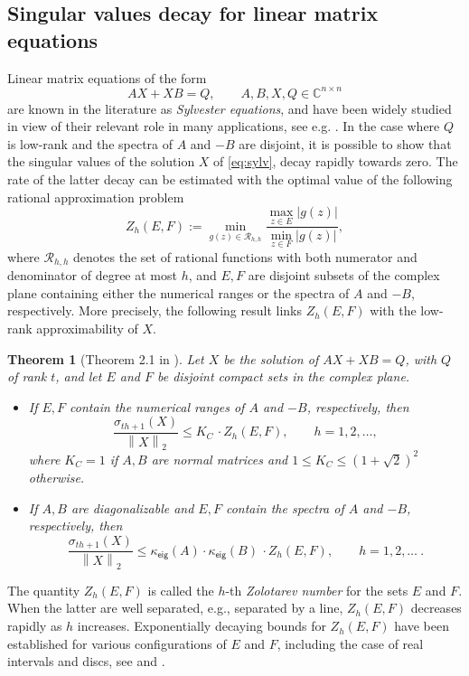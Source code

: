 \documentclass[a4paper,10pt]{article}
\newcommand{\norm}[1]{\left\lVert#1\right\rVert}
\newtheorem{theorem}[definition]{Theorem}
\newcommand{\upd}[1]{{\color{black}#1}} %
\begin{document}
\subsection{Singular values decay for linear matrix equations}\label{sec:decay-sylv}
Linear matrix equations of the form
\begin{equation}\label{eq:sylv}
AX+XB= Q, \qquad A,B,X,Q\in\mathbb C^{n\times n}
\end{equation}
are known in the literature as \emph{Sylvester equations}, and have been widely studied in view of their relevant role in many applications, \upd{see e.g.} \cite{simoncini16}. In the case where $Q$ is low-rank and the spectra of $A$ and $-B$ are disjoint, it is possible to show that the singular values of the solution $X$ of \eqref{eq:sylv}, decay rapidly towards zero. The rate of the latter decay can be estimated with the optimal value of the following rational approximation problem
$$
Z_h(E,F) := \min_{g(z)\in\mathcal R_{h,h}}\frac{\max_{z\in E} |g(z)|}{\min_{z\in F} |g(z)|}, 
$$
where $\mathcal R_{h,h}$ denotes the set of rational functions with both numerator and denominator of degree at most $h$, and $E,F$ are disjoint subsets of the complex plane containing either the numerical ranges or the spectra of $A$ and $-B$, respectively. More precisely, the following result links $Z_h(E, F)$ with the low-rank approximability of $X$.
\begin{theorem}[Theorem 2.1 in \cite{beckermann17}]\label{thm:zol}
Let $X$ be the solution of $AX+XB=Q$, with $Q$ of rank $t$, and let 
	$E$ and $F$ be disjoint compact sets in the complex plane.
	\begin{itemize}
		\item[$(i)$] If $E,F$ contain
		the numerical ranges of $A$ and $-B$, respectively, then
		\[
		\frac{\sigma_{th+1}(X)}{\norm{ X}_2}\leq  K_C\,\cdot Z_h(E,F),\qquad h=1,2,\dots,
		\]
		where $K_C = 1$ if $A,B$ are normal matrices and $1\le K_C \le (1+\sqrt{2})^2$ otherwise.
		\item[$(ii)$] If $A,B$ are diagonalizable and $E,F$ contain
		the spectra of $A$ and $-B$, respectively, then
		\[
		\frac{\sigma_{th+1}(X)}{\norm{ X}_2}\leq  \kappa_{\mathsf{eig}}(A)\cdot \kappa_{\mathsf{eig}}(B)\,\cdot Z_h(E,F),\qquad h=1,2,\dots\ .
		\]
	\end{itemize}
\end{theorem}


The quantity  $Z_h(E,F)$ is called the $h$-th \emph{Zolotarev number} for the sets $E$ and $F$. When the latter are well separated, e.g., separated by a line, $Z_h (E, F )$
decreases rapidly as $h$ increases. Exponentially decaying bounds for  $Z_h (E, F )$ have been established for various
configurations of $E$ and $F$, including the case of real intervals and discs, see \cite{beckermann17} and \cite[Section 2]{kressner23}.
\end{document}
